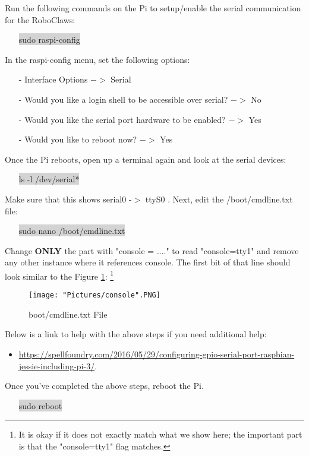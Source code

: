 \documentclass[12pt]{article}
\begin{document}
\noindent Run the following commands on the Pi to setup/enable the serial communication for the RoboClaws:
\begin{itemize}
	\item[] \colorbox{lightgray}{sudo raspi-config}
\end{itemize}

\noindent In the raspi-config menu, set the following options:
\begin{itemize}
	\item[-]  Interface Options $-> $ Serial 
	\item[-] Would you like a login shell to be accessible over serial? $->$ No
	\item[-] Would you like the serial port hardware to be enabled? $->$ Yes
	\item[-] Would you like to reboot now? $->$ Yes
\end{itemize} 
\noindent Once the Pi reboots, open up a terminal again and look at the serial devices:
\begin{itemize}
	\item[] \colorbox{lightgray}{ls -l /dev/serial*}
\end{itemize}
Make sure that this shows serial0 -$>$ ttyS0 . Next, edit the /boot/cmdline.txt file:
\begin{itemize}
	\item [] \colorbox{lightgray}{sudo nano /boot/cmdline.txt}
\end{itemize}

\noindent Change \textbf{ONLY} the part with "console = ...." to read "console=tty1" and remove any other instance where it references console. The first bit of that line should look similar to the Figure \ref{console}: \footnote{It is okay if it does not exactly match what we show here; the important part is that the "console=tty1" flag matches.}

\begin{figure}[H]
 	\centering
	\texttt{[image: "Pictures/console".PNG]}
 	\caption{boot/cmdline.txt File}
	\label{console}
\end{figure}

\noindent Below is a link to help with the above steps if you need additional help:
\begin{itemize}
	\item \href{https://spellfoundry.com/2016/05/29/configuring-gpio-serial-port-raspbian-jessie-including-pi-3/}{https://spellfoundry.com/2016/05/29/configuring-gpio-serial-port-raspbian-jessie-including-pi-3/}. 
\end{itemize}
\noindent Once you've completed the above steps, reboot the Pi.
\begin{itemize}
	\item[] \colorbox{lightgray}{sudo reboot}
\end{itemize}
\end{document}
